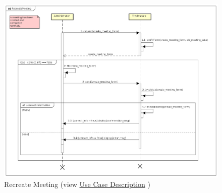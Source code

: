 \begin{figure}[h]
	\centering\includegraphics[width=\textwidth]{Images/SequenceDiagrams/Admin/RecreateMeeting.png}{}
	\caption[Recreate Meeting]{{Recreate Meeting}\label{SeqDiagr:RecreateMeeting} (view \hyperref[UseCaseDescr:RecreateMeeting]{Use Case Description} )}
\end{figure}

